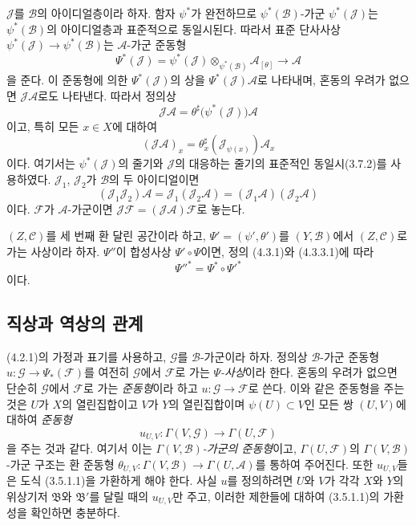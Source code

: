 \begin{env}[4.3.5]
\label{0.4.3.5-ko}
$\mathcal J$를 $\mathcal B$의 아이디얼층이라 하자. 함자 $\psi^*$가
완전하므로 $\psi^*(\mathcal B)$-가군 $\psi^*(\mathcal J)$는
$\psi^*(\mathcal B)$의 아이디얼층과 표준적으로 동일시된다.
따라서 표준 단사사상
$\psi^*(\mathcal J)\to\psi^*(\mathcal B)$는
$\mathcal A$-가군 준동형
\[
  \Psi^*(\mathcal J)
  =\psi^*(\mathcal J)
   \otimes_{\psi^*(\mathcal B)}\mathcal A_{[\theta]}
  \longrightarrow\mathcal A
\]
을 준다. 이 준동형에 의한 $\Psi^*(\mathcal J)$의 상을
$\Psi^*(\mathcal J)\mathcal A$로 나타내며, 혼동의 우려가 없으면
$\mathcal J\mathcal A$로도 나타낸다. 따라서 정의상
\[
  \mathcal J\mathcal A
  =\theta^\sharp\bigl(\psi^*(\mathcal J)\bigr)\mathcal A
\]
이고, 특히 모든 $x\in X$에 대하여
\[
  (\mathcal J\mathcal A)_x
  =\theta_x^\sharp(\mathcal J_{\psi(x)})\mathcal A_x
\]
이다. 여기서는 $\psi^*(\mathcal J)$의 줄기와
$\mathcal J$의 대응하는 줄기의 표준적인 동일시(3.7.2)를 사용하였다.
$\mathcal J_1$, $\mathcal J_2$가 $\mathcal B$의 두 아이디얼이면
\[
  (\mathcal J_1\mathcal J_2)\mathcal A
  =\mathcal J_1(\mathcal J_2\mathcal A)
  =(\mathcal J_1\mathcal A)(\mathcal J_2\mathcal A)
\]
이다. $\mathcal F$가 $\mathcal A$-가군이면
$\mathcal J\mathcal F=(\mathcal J\mathcal A)\mathcal F$로 놓는다.
\end{env}

\begin{env}[4.3.6]
\label{0.4.3.6-ko}
$(Z,\mathcal C)$를 세 번째 환 달린 공간이라 하고,
$\Psi'=(\psi',\theta')$를 $(Y,\mathcal B)$에서
$(Z,\mathcal C)$로 가는 사상이라 하자. $\Psi''$이 합성사상
$\Psi'\circ\Psi$이면, 정의 (4.3.1)와 (4.3.3.1)에 따라
\[
  {\Psi''}^*=\Psi^*\circ{\Psi'}^*
\]
이다.
\end{env}

\subsection{직상과 역상의 관계}
\label{subsection:0.4.4-ko}

\begin{env}[4.4.1]
\label{0.4.4.1-ko}
(4.2.1)의 가정과 표기를 사용하고, $\mathcal G$를 $\mathcal B$-가군이라
하자. 정의상 $\mathcal B$-가군 준동형
$u:\mathcal G\to\Psi_*(\mathcal F)$를 여전히 $\mathcal G$에서
$\mathcal F$로 가는 \emph{$\Psi$-사상}이라 한다. 혼동의 우려가 없으면
단순히 $\mathcal G$에서 $\mathcal F$로 가는 \emph{준동형}이라 하고
$u:\mathcal G\to\mathcal F$로 쓴다.
이와 같은 준동형을 주는 것은 $U$가 $X$의 열린집합이고 $V$가 $Y$의
열린집합이며 $\psi(U)\subset V$인 모든 쌍 $(U,V)$에 대하여
\emph{준동형}
\[
  u_{U,V}:\Gamma(V,\mathcal G)\longrightarrow\Gamma(U,\mathcal F)
\]
을 주는 것과 같다. 여기서 이는 \emph{$\Gamma(V,\mathcal B)$-가군의
준동형}이고, $\Gamma(U,\mathcal F)$의 $\Gamma(V,\mathcal B)$-가군 구조는
환 준동형
$\theta_{U,V}:\Gamma(V,\mathcal B)\to\Gamma(U,\mathcal A)$를 통하여
주어진다. 또한 $u_{U,V}$들은 도식 (3.5.1.1)을 가환하게 해야 한다.
사실 $u$를 정의하려면 $U$와 $V$가 각각 $X$와 $Y$의 위상기저
$\mathfrak B$와 $\mathfrak B'$를 달릴 때의 $u_{U,V}$만 주고,
이러한 제한들에 대하여 (3.5.1.1)의 가환성을 확인하면 충분하다.
\end{env}

